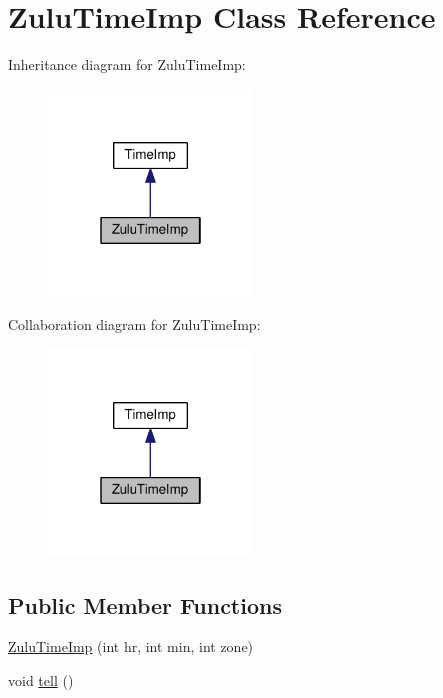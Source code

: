 \hypertarget{classZuluTimeImp}{}\section{Zulu\+Time\+Imp Class Reference}
\label{classZuluTimeImp}


Inheritance diagram for Zulu\+Time\+Imp\+:
\nopagebreak
\begin{figure}[H]
\begin{center}
\leavevmode
\includegraphics[width=154pt]{classZuluTimeImp__inherit__graph}
\end{center}
\end{figure}


Collaboration diagram for Zulu\+Time\+Imp\+:
\nopagebreak
\begin{figure}[H]
\begin{center}
\leavevmode
\includegraphics[width=154pt]{classZuluTimeImp__coll__graph}
\end{center}
\end{figure}
\subsection*{Public Member Functions}
\begin{DoxyCompactItemize}
\item 
\hyperlink{classZuluTimeImp_af75d85b608a7d4d783e46d868aee841c}{Zulu\+Time\+Imp} (int hr, int min, int zone)
\item 
void \hyperlink{classZuluTimeImp_ac7b726f1341e591e346240327dd8bbd1}{tell} ()
\end{DoxyCompactItemize}
